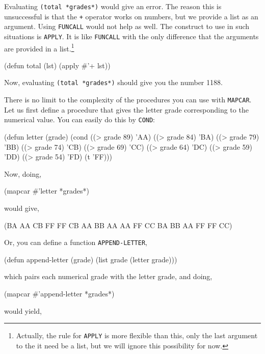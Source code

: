 \documentclass[a4paper,11pt]{article}
\begin{document}
\begin{uenum}
Evaluating \Verb+(total *grades*)+ would give an error. The reason this is unsuccessful is that the \Verb=+= operator works on numbers, but we provide a list as an argument. Using \Verb+FUNCALL+ would not help as well. The construct to use in such situations is \Verb+APPLY+. It is like \Verb+FUNCALL+ with the only difference that the arguments are provided in a list.\footnote{Actually, the rule for \Verb+APPLY+ is more flexible than this, only the last argument to the it need be a list, but we will ignore this possibility for now.} 

\begin{lispcode}
(defun total (lst)
  (apply #'+ lst))
\end{lispcode}

Now, evaluating \Verb+(total *grades*)+ should give you the number 1188. 

\item There is no limit to the complexity of the procedures you can use with \Verb+MAPCAR+. Let us first define a procedure that gives the letter grade corresponding to the numerical value. You can easily do this by \Verb+COND+: 

\begin{lispcode}
(defun letter (grade)
  (cond ((> grade 89) 'AA)
        ((> grade 84) 'BA)
        ((> grade 79) 'BB)
        ((> grade 74) 'CB)
        ((> grade 69) 'CC)
        ((> grade 64) 'DC)
        ((> grade 59) 'DD)
        ((> grade 54) 'FD)
        (t 'FF)))
\end{lispcode}

Now, doing,

\begin{lispcode}
(mapcar #'letter *grades*)
\end{lispcode}
would give,

\begin{lispcode}
(BA AA CB FF FF CB AA BB AA AA FF CC BA BB AA FF FF CC)
\end{lispcode}

Or, you can define a function \Verb+APPEND-LETTER+,

\begin{lispcode}
(defun append-letter (grade)
  (list grade (letter grade)))
\end{lispcode}
which pairs each numerical grade with the letter grade, and doing,

\begin{lispcode}
(mapcar #'append-letter *grades*)
\end{lispcode}
would yield,


\end{uenum}
\end{document}
